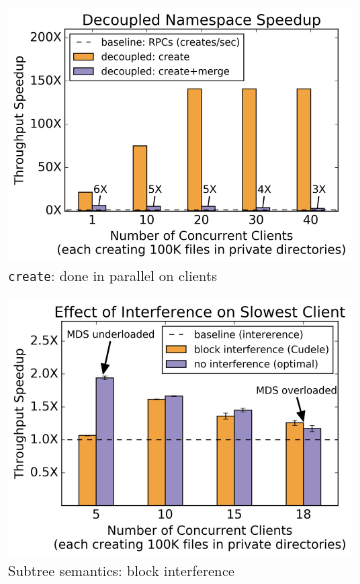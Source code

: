 \begin{figure}[t]
  \centering
  \begin{subfigure}[b]{.3\linewidth}
      \centering
      \includegraphics[width=1.0\linewidth]{graphs/mergescale.png}
      \caption{\texttt{create}: done in parallel on clients}
      \label{fig:mergescale}
  \end{subfigure}
  \begin{subfigure}[b]{.3\linewidth}
      \centering
      \includegraphics[width=1.0\linewidth]{graphs/block-allow.png}
      \caption{Subtree semantics: block interference}
      \label{fig:block-allow}
  \end{subfigure}
  \begin{subfigure}[b]{.3\linewidth}

\end{subfigure}
\end{figure}
